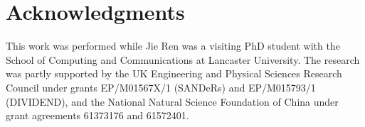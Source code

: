 \section*{Acknowledgments}
This work was performed while Jie Ren was a visiting PhD student with the School of Computing and Communications at
Lancaster University. The research was partly supported by the UK Engineering and Physical Sciences Research Council
under grants EP/M01567X/1 (SANDeRs) and EP/M015793/1 (DIVIDEND), and the National Natural Science Foundation of China
under grant agreements 61373176 and 61572401.
